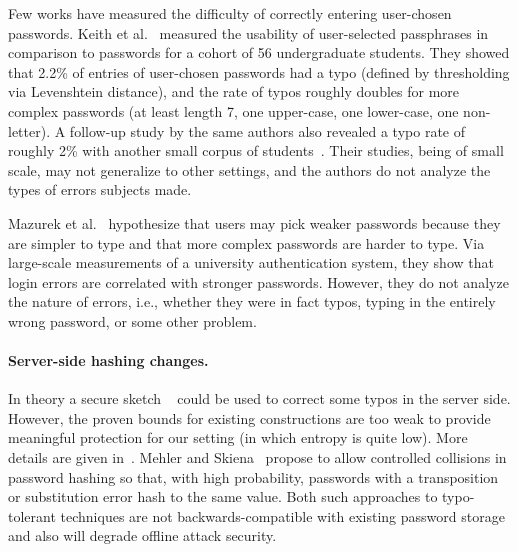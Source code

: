 Few works have measured the difficulty of correctly
entering user-chosen passwords. Keith et al.~\cite{keith2007usability} measured
the usability of user-selected passphrases in comparison to passwords
for a cohort of 56 undergraduate students. 
They showed that 2.2\% of entries of user-chosen passwords had a typo
(defined by thresholding via Levenshtein distance), and the rate of
typos roughly doubles for more complex passwords (at least length 7,
one upper-case, one lower-case, one non-letter). A follow-up study by
the same authors also revealed a typo rate of roughly 2\% with another
small corpus of students~\cite{keith2009behavioral}.  Their studies,
being of small scale, may not generalize to other settings, and the
authors do not analyze the types of errors subjects made.

Mazurek et al.~\cite{mazurek2013measuring} hypothesize that users may pick
weaker passwords because they are simpler to type and that more
complex passwords are harder to type. Via large-scale measurements of
a university authentication system, they show that login errors are
correlated with stronger passwords. However, they do not analyze
the nature of errors, i.e., whether they were in fact typos, typing in the entirely
wrong password, or some other problem.


\paragraph{Server-side hashing changes.} In theory a secure sketch
  ~\cite{dodisetal:2004} could be used to correct some typos in the server
  side. However, the proven bounds for existing constructions are too weak to provide
meaningful protection for our setting (in which entropy is quite
  low). More details are given in~. Mehler and
Skiena~\cite{mehler2006improving} propose to allow controlled collisions in
password hashing so that, with high probability, passwords with a transposition
or substitution error hash to the same value. Both such approaches to
typo-tolerant techniques are not backwards-compatible with existing password
storage and also will degrade offline attack security.



